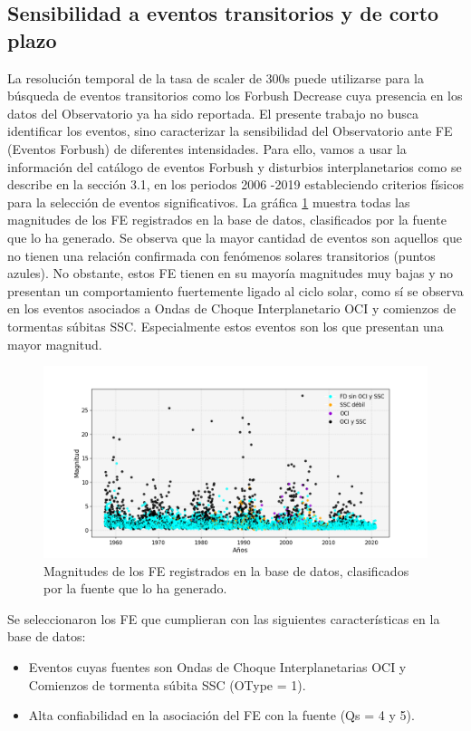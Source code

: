 \subsection{Sensibilidad a eventos transitorios y de corto plazo}
La resolución temporal de la tasa de scaler de 300s puede utilizarse para la búsqueda de eventos transitorios como los Forbush Decrease cuya presencia en los datos del Observatorio ya ha sido reportada. El presente trabajo no busca identificar los eventos, sino caracterizar la sensibilidad del Observatorio ante FE (Eventos Forbush) de diferentes intensidades. Para ello, vamos a usar la información del catálogo de eventos Forbush y disturbios interplanetarios como se describe en la sección 3.1, en los periodos 2006 -2019 estableciendo criterios físicos para la selección de eventos significativos. La gráfica \ref{fig:FD_events} muestra todas las magnitudes de los FE registrados en la base de datos, clasificados por la fuente que lo ha generado. Se observa que la mayor cantidad de eventos son aquellos que no tienen una relación confirmada  con fenómenos solares transitorios (puntos azules). No obstante, estos FE tienen en su mayoría magnitudes muy bajas y no presentan un comportamiento fuertemente ligado al ciclo solar, como sí se observa en los eventos asociados a Ondas de Choque Interplanetario OCI y comienzos de tormentas súbitas SSC. Especialmente estos eventos son los que presentan una mayor magnitud.
\begin{figure}
\centering
\includegraphics[width=1.2\linewidth]{Figs/Figr/forbush_events.png}
    \caption{Magnitudes de los FE registrados en la base de datos, clasificados por la fuente que lo ha generado. }
    \label{fig:FD_events}
\end{figure}
Se seleccionaron los FE que cumplieran con las siguientes características en la base de datos:
\begin{itemize}
    \item Eventos cuyas fuentes son Ondas de Choque Interplanetarias OCI y Comienzos de tormenta súbita SSC (OType = 1).
    \item Alta confiabilidad en la asociación del FE con la fuente (Qs = 4 y 5).
\end{itemize}
